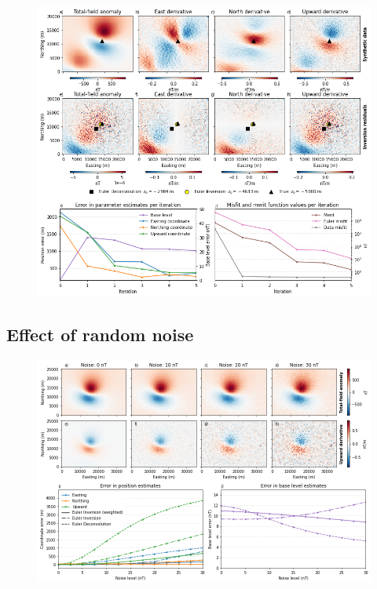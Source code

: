 \begin{figure}[tb!]
\centering
\includegraphics[width=1\linewidth]{figures/synthetic-proof-of-concept.png}
\caption{
  \lipsum[1]
}
\label{fig:proof}
\end{figure}


\subsection{Effect of random noise}

\begin{figure}[tb!]
\centering
\includegraphics[width=1\linewidth]{figures/synthetic-noise-levels.png}
\caption{
  \lipsum[1]
}
\label{fig:noise}
\end{figure}

